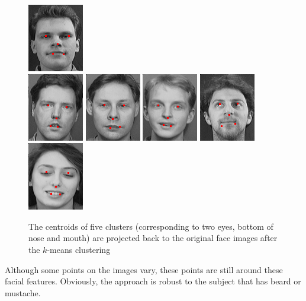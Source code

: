 \begin{figure}[ht]
\begin{center}
 \includegraphics[width=0.15\columnwidth]{ch3/figures/kmeanresult15.png}\\
 \includegraphics[width=0.15\columnwidth]{ch3/figures/kmeanresult16.png}
 \includegraphics[width=0.15\columnwidth]{ch3/figures/kmeanresult17.png}
 \includegraphics[width=0.15\columnwidth]{ch3/figures/kmeanresult18.png}
 \includegraphics[width=0.15\columnwidth]{ch3/figures/kmeanresult19.png}
 \includegraphics[width=0.15\columnwidth]{ch3/figures/kmeanresult20.png}
\caption{The centroids of five clusters (corresponding to two eyes, bottom of nose and mouth) are projected back to the original face images after the $k$-means clustering}
\label{fig:fivepointsnormal}
\end{center}
\end{figure} 
Although some points on the images vary, these points are still around these facial features. Obviously, the approach is robust to the subject that has beard or mustache.

